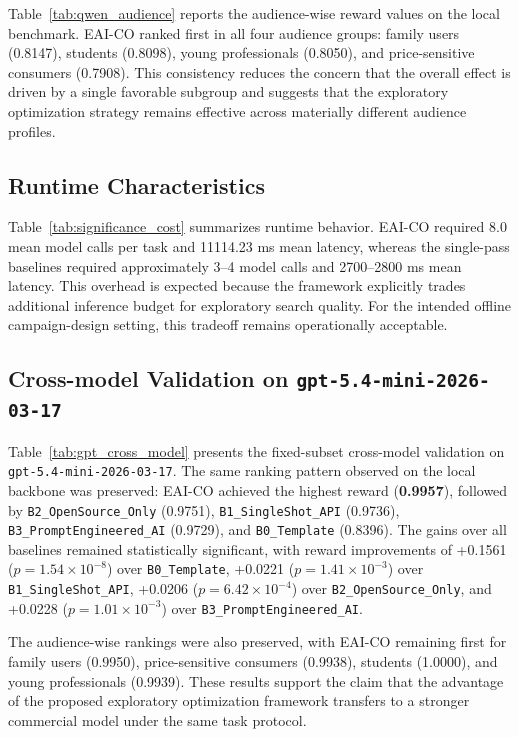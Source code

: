 \documentclass[preprint,12pt]{elsarticle}
\begin{document}
Table~\ref{tab:qwen_audience} reports the audience-wise reward values on the local benchmark. EAI-CO ranked first in all four audience groups: family users (0.8147), students (0.8098), young professionals (0.8050), and price-sensitive consumers (0.7908). This consistency reduces the concern that the overall effect is driven by a single favorable subgroup and suggests that the exploratory optimization strategy remains effective across materially different audience profiles.

\subsection{Runtime Characteristics}

Table~\ref{tab:significance_cost} summarizes runtime behavior. EAI-CO required 8.0 mean model calls per task and 11114.23 ms mean latency, whereas the single-pass baselines required approximately 3--4 model calls and 2700--2800 ms mean latency. This overhead is expected because the framework explicitly trades additional inference budget for exploratory search quality. For the intended offline campaign-design setting, this tradeoff remains operationally acceptable.

\subsection{Cross-model Validation on \texttt{gpt-5.4-mini-2026-03-17}}

Table~\ref{tab:gpt_cross_model} presents the fixed-subset cross-model validation on \texttt{gpt-5.4-mini-2026-03-17}. The same ranking pattern observed on the local backbone was preserved: EAI-CO achieved the highest reward (\textbf{0.9957}), followed by \texttt{B2\_OpenSource\_Only} (0.9751), \texttt{B1\_SingleShot\_API} (0.9736), \texttt{B3\_PromptEngineered\_AI} (0.9729), and \texttt{B0\_Template} (0.8396). The gains over all baselines remained statistically significant, with reward improvements of +0.1561 ($p=1.54\times10^{-8}$) over \texttt{B0\_Template}, +0.0221 ($p=1.41\times10^{-3}$) over \texttt{B1\_SingleShot\_API}, +0.0206 ($p=6.42\times10^{-4}$) over \texttt{B2\_OpenSource\_Only}, and +0.0228 ($p=1.01\times10^{-3}$) over \texttt{B3\_PromptEngineered\_AI}.

The audience-wise rankings were also preserved, with EAI-CO remaining first for family users (0.9950), price-sensitive consumers (0.9938), students (1.0000), and young professionals (0.9939). These results support the claim that the advantage of the proposed exploratory optimization framework transfers to a stronger commercial model under the same task protocol.
\end{document}
